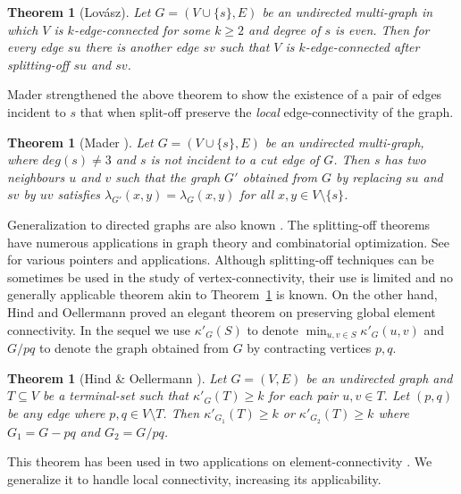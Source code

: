 \documentclass[11pt]{article}
\newtheorem{theorem}[lemma]{Theorem}
\newcommand{\elconn}{\kappa'}
\begin{document}
\begin{theorem}[Lov\'{a}sz]
  Let $G=(V\cup\{s\}, E)$ be an undirected multi-graph in which $V$ is
  $k$-edge-connected for some $k \ge 2$ and degree of $s$ is
  even. Then for every edge $su$ there is another edge $sv$ such that
  $V$ is $k$-edge-connected after splitting-off $su$ and $sv$.
\end{theorem}

Mader strengthened the above theorem to show the existence of
a pair of edges incident to $s$ that when split-off preserve the
{\em local} edge-connectivity of the graph. 

\begin{theorem}[Mader \cite{Mader}]
  \label{thm:mader}
  Let $G=(V\cup \{s\},E)$ be an undirected multi-graph, where $deg(s)
  \neq 3$ and $s$ is not incident to a cut edge of $G$.  Then $s$
  has two neighbours $u$ and $v$ such that the graph $G'$ obtained
  from $G$ by replacing $su$ and $sv$ by $uv$ satisfies
  $\lambda_{G'}(x,y) = \lambda_G(x,y)$ for all $x,y \in V \setminus
  \{s\}$.
\end{theorem}

Generalization to directed graphs are also known
\cite{Mader,Frank,Jackson}. The splitting-off theorems have numerous
applications in graph theory and combinatorial optimization. See
\cite{Lovasz,Frank92,Kriesell,JainMS03,ChekuriS,Lau1,Lau2,LauK} for
various pointers and applications.  Although splitting-off techniques
can be sometimes be used in the study of vertex-connectivity, their
use is limited and no generally applicable theorem akin to
Theorem~\ref{thm:mader} is known. On the other hand, Hind and
Oellermann \cite{hind} proved an elegant theorem on preserving global
element connectivity. In the sequel we use $\elconn_G(S)$ to denote
$\min_{u,v \in S} \elconn_G(u,v)$ and $G/pq$ to denote the graph
obtained from $G$ by contracting vertices $p,q$.

\begin{theorem}[Hind \& Oellermann \cite{hind}]
  \label{thm:ho}
  Let $G=(V,E)$ be an undirected graph and $T \subseteq V$ be a terminal-set
  such that $\elconn_G(T) \ge k$ for each pair $u,v \in T$. 
  Let $(p,q)$ be {\em any} edge where $p,q \in V \setminus T$. Then
  $\elconn_{G_1}(T) \ge k$ or $\elconn_{G_2}(T) \ge k$ where $G_1 = G - pq$
  and $G_2 = G/pq$. 
\end{theorem}

This theorem has been used in two applications on element-connectivity
\cite{cs,LauK}. We generalize it to handle local connectivity,
increasing its applicability. 
\end{document}
